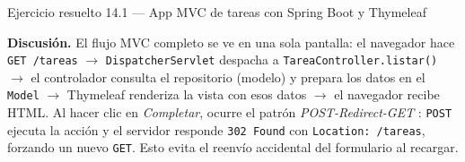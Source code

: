 \documentclass[11pt,a4paper,openany]{book}
\begin{document}
\begin{cajaejemplo}{Ejercicio resuelto 14.1 --- App MVC de tareas con Spring Boot y Thymeleaf}
\begin{center}
\end{center}

\textbf{Discusión.} El flujo MVC completo se ve en una sola pantalla:
el navegador hace \texttt{GET /tareas} $\to$
\texttt{DispatcherServlet} despacha a \texttt{TareaController.listar()}
$\to$ el controlador consulta el repositorio (modelo) y prepara los
datos en el \texttt{Model} $\to$ Thymeleaf renderiza la vista con esos
datos $\to$ el navegador recibe HTML. Al hacer clic en
\emph{Completar}, ocurre el patrón \emph{POST-Redirect-GET}
\cite{walls2022spring}: \texttt{POST} ejecuta la acción y el
servidor responde \texttt{302 Found} con \texttt{Location: /tareas},
forzando un nuevo \texttt{GET}. Esto evita el reenvío accidental del
formulario al recargar.
\end{cajaejemplo}
\end{document}
